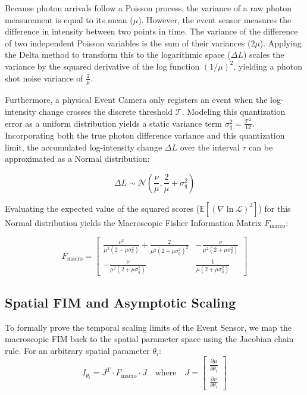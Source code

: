 \documentclass[11pt]{article}
\begin{document}
Because photon arrivals follow a Poisson process, the variance of a raw photon measurement is equal to its mean ($\mu$). However, the event sensor measures the difference in intensity between two points in time. The variance of the difference of two independent Poisson variables is the sum of their variances ($2\mu$). Applying the Delta method to transform this to the logarithmic space ($\Delta L$) scales the variance by the squared derivative of the log function $(1/\mu)^2$, yielding a photon shot noise variance of $\frac{2}{\mu}$.

Furthermore, a physical Event Camera only registers an event when the log-intensity change crosses the discrete threshold $\mathcal{T}$. Modeling this quantization error as a uniform distribution yields a static variance term $\sigma_q^2 = \frac{\mathcal{T}^2}{12}$. Incorporating both the true photon difference variance and this quantization limit, the accumulated log-intensity change $\Delta L$ over the interval $\tau$ can be approximated as a Normal distribution:

\begin{equation}
\Delta L \sim \mathcal{N}\left( \frac{\nu}{\mu}, \frac{2}{\mu} + \sigma_q^2 \right)
\end{equation}

Evaluating the expected value of the squared scores ($\mathbb{E}[(\nabla \ln \mathcal{L})^2]$) for this Normal distribution yields the Macroscopic Fisher Information Matrix $F_{\text{macro}}$:

\begin{equation}
F_{\text{macro}} = 
\begin{bmatrix}
\frac{\nu^2}{\mu^3(2 + \mu\sigma_q^2)} + \frac{2}{\mu^2(2 + \mu\sigma_q^2)^2} & -\frac{\nu}{\mu^2(2 + \mu\sigma_q^2)} \\[1em]
-\frac{\nu}{\mu^2(2 + \mu\sigma_q^2)} & \frac{1}{\mu(2 + \mu\sigma_q^2)}
\end{bmatrix}
\end{equation}

\subsection{Spatial FIM and Asymptotic Scaling}
To formally prove the temporal scaling limits of the Event Sensor, we map the macroscopic FIM back to the spatial parameter space using the Jacobian chain rule. For an arbitrary spatial parameter $\theta_i$:
\begin{equation}
I_{\theta_i} = J^T \cdot F_{\text{macro}} \cdot J \quad \text{where} \quad J = \begin{bmatrix} \frac{\partial \mu}{\partial \theta_i} \\[0.5em] \frac{\partial \nu}{\partial \theta_i} \end{bmatrix}
\end{equation}
\end{document}
